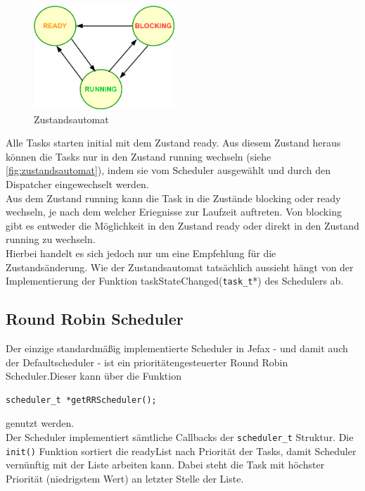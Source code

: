 \documentclass[fontsize=12pt, toc=bibliography, notitlepage]{scrreprt}
\begin{document}
\begin{figure}[H]
	\centering
	\includegraphics[width=200px]{images/Zustandsautomat.png}
	\caption{Zustandsautomat}
	\label{fig:zustandsautomat}
\end{figure}

Alle Tasks starten initial mit dem Zustand ready. Aus diesem Zustand heraus können die Tasks nur in den Zustand running wechseln (siehe \autoref{fig:zustandsautomat}), indem sie vom Scheduler ausgewählt und durch den Dispatcher eingewechselt werden.\\

Aus dem Zustand running kann die Task in die Zustände blocking oder ready wechseln, je nach dem welcher Eriegnisse zur Laufzeit auftreten. Von blocking gibt es entweder die Möglichkeit in den Zustand ready oder direkt in den Zustand running zu wechseln.\\

Hierbei handelt es sich jedoch nur um eine Empfehlung für die Zustandsänderung. Wie der Zustandsautomat tatsächlich aussieht hängt von der Implementierung der Funktion taskStateChanged(\verb|task_t|*) des Schedulers ab.

\subsection{Round Robin Scheduler}
\label{subsec:round-robin-scheduler}
Der einzige standardmäßig implementierte Scheduler in Jefax - und damit auch der Defaultscheduler - ist ein prioritätengesteuerter Round Robin Scheduler.Dieser kann über die Funktion

\begin{lstlisting}
scheduler_t *getRRScheduler();
\end{lstlisting}

genutzt werden.\\

Der Scheduler implementiert sämtliche Callbacks der \verb|scheduler_t| Struktur.
Die \lstinline$init()$ Funktion sortiert die readyList nach Priorität der Tasks, damit Scheduler vernünftig mit der Liste arbeiten kann. Dabei steht die Task mit höchster Priorität (niedrigstem Wert) an letzter Stelle der Liste.\\
\end{document}
